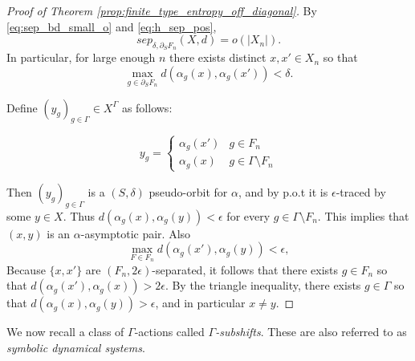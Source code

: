 \documentclass[oneside,english]{amsart}
\newtheorem{thm}{Theorem}[section]
\newtheorem{prop}[thm]{Proposition}
\theoremstyle{definition}
\newcommand{\Act}[2]{\mathit{Act}({#1},{#2})}
\newcommand{\sep}{\mathit{sep}}
\begin{document}
\begin{proof}[Proof of Theorem \ref{prop:finite_type_entropy_off_diagonal}]
By \eqref{eq:sep_bd_small_o} and \eqref{eq:h_sep_pos},
$$  \sep_{\delta,\partial_S F_n}(X,d) = o(|X_n|).$$
In particular, for large enough $n$ there exists distinct $x,x' \in X_n$  so that
\begin{equation}
\max_{g \in \partial_S F_n}d(\alpha_g(x),\alpha_g(x')) < \delta.
\end{equation}

Define $(y_g)_{g \in \Gamma} \in X^\Gamma$ as follows:

\begin{equation}
y_g = \begin{cases}
\alpha_g(x') & g \in F_n\\
\alpha_g(x) &  g \in \Gamma \setminus F_n
\end{cases}
\end{equation}

Then $(y_g)_{g \in \Gamma}$ is a $(S,\delta)$ pseudo-orbit for $\alpha$, and by p.o.t it is $\epsilon$-traced by some $y \in X$.
Thus
$d(\alpha_g(x),\alpha_g(y)) < \epsilon$ for every $g \in \Gamma \setminus F_n$.
This implies that $(x,y)$ is an $\alpha$-asymptotic pair.
Also
$$\max_{F \in F_n}d(\alpha_g(x'),\alpha_g(y)) < \epsilon,$$
Because $\{x,x'\}$ are $(F_n,2\epsilon)$-separated, it follows that
there exists $g \in F_n$ so that $d(\alpha_g(x'),\alpha_g(x)) > 2\epsilon$.
By the triangle inequality, there exists $g \in \Gamma$ so that $d(\alpha_g(x),\alpha_g(y))>\epsilon$, and in particular $x \ne y$.
\end{proof}





We now recall a class of $\Gamma$-actions called  \emph{$\Gamma$-subshifts}. These are also referred to as \emph{symbolic dynamical systems}.%
\end{document}
